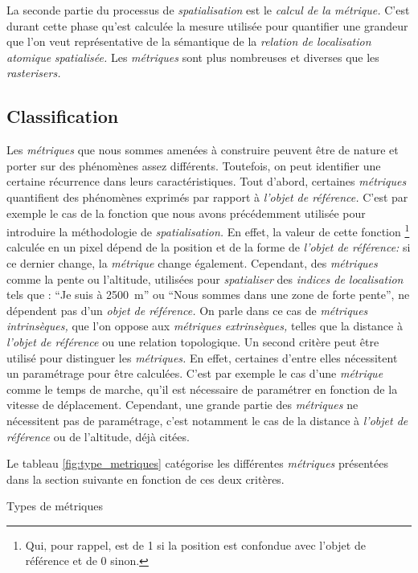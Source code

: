 La seconde partie du processus de \emph{spatialisation} est le
\emph{calcul de la métrique.} C'est durant cette phase qu'est calculée
la mesure utilisée pour quantifier une grandeur que l'on veut
représentative de la sémantique de la \emph{relation de localisation
  atomique} \emph{spatialisée.} Les \emph{métriques} sont plus
nombreuses et diverses que les \emph{rasterisers.}

\subsection{Classification}
Les \emph{métriques} que nous sommes amenées à construire peuvent être
de nature et porter sur des phénomènes assez différents. Toutefois, on
peut identifier une certaine récurrence dans leurs
caractéristiques. Tout d'abord, certaines \emph{métriques} quantifient
des phénomènes exprimés par rapport à \emph{l'objet de référence.}
C'est par exemple le cas de la fonction que nous avons précédemment
utilisée pour introduire la méthodologie de \emph{spatialisation.} En
effet, la valeur de cette fonction \footnote{Qui, pour rappel, est de
  1 si la position est confondue avec l'objet de référence et de 0
  sinon.} calculée en un pixel dépend de la position et de la forme de
\emph{l'objet de référence:} si ce dernier change, la \emph{métrique}
change également. Cependant, des \emph{métriques} comme la pente ou
l'altitude, utilisées pour \emph{spatialiser} des \emph{indices de
  localisation} tels que : \enquote{Je suis à \SI{2500}{\meter}} ou
\enquote{Nous sommes dans une zone de forte pente}, ne dépendent pas
d'un \emph{objet de référence.} On parle dans ce cas de
\emph{métriques intrinsèques,} que l'on oppose aux \emph{métriques
  extrinsèques,} telles que la distance à \emph{l'objet de référence}
ou une relation topologique. Un second critère peut être utilisé pour
distinguer les \emph{métriques.}  En effet, certaines d'entre elles
nécessitent un paramétrage pour être calculées. C'est par exemple le
cas d'une \emph{métrique} comme le temps de marche, qu'il est
nécessaire de paramétrer en fonction de la vitesse de
déplacement. Cependant, une grande partie des \emph{métriques} ne
nécessitent pas de paramétrage, c'est notamment le cas de la distance
à \emph{l'objet de référence} ou de l'altitude, déjà citées.

Le tableau \ref{fig:type_metriques} catégorise les différentes
\emph{métriques} présentées dans la section suivante en fonction de
ces deux critères.

\begin{table}
  \centering
  
  \caption{Types de métriques}
  \label{fig:type_metriques}
\end{table}


